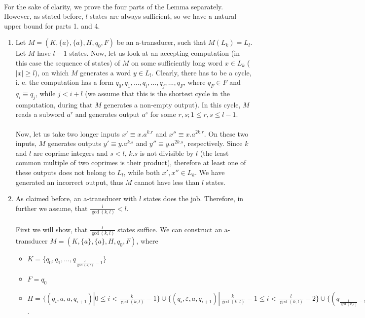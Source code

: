 \paragraph{}
\dokaz For the sake of clarity, we prove the four parts of the Lemma separately. However, as stated before, $l$ states are always sufficient, so we have a natural upper bound for parts 1. and 4.
\begin{enumerate}
\item Let $M = (K, \{a\}, \{a\}, H, q_0, F)$ be an a-transducer, such that $M(L_k) = L_l$. Let $M$ have $l-1$ states. Now, let us look at an accepting computation (in this case the sequence of states) of $M$ on some sufficiently long word $x \in L_k$ ($|x| \geq l$), on which $M$ generates a word $y \in L_l$. Clearly, there has to be a cycle, i. e. the computation has a form $q_0, q_1, ..., q_i, ..., q_j, ..., q_F$, where $q_F \in F$ and $q_i \equiv q_j$, while $j < i + l$ (we assume that this is the shortest cycle in the computation, during that $M$ generates a non-empty output). In this cycle, $M$ reads a subword $a^r$ and generates output $a^s$ for some $r,s; 1 \leq r,s \leq l-1$.

\paragraph{}
Now, let us take two longer inputs $x' \equiv x.a^{k.r}$ and $x'' \equiv x.a^{2k.r}$. On these two inputs, $M$ generates outputs $y' \equiv y.a^{k.s}$ and $y'' \equiv y.a^{2k.s}$, respectively. Since $k$ and $l$ are coprime integers and $s < l$, $k.s$ is not divisible by $l$ (the least common multiple of two coprimes is their product), therefore at least one of these outputs does not belong to $L_l$, while both $x', x'' \in L_k$. We have generated an incorrect output, thus $M$ cannot have less than $l$ states.

\item As claimed before, an a-transducer with $l$ states does the job. Therefore, in further we assume, that $\frac{l}{\gcd(k,l)} < l$.

\paragraph{}
First we will show, that $\frac{l}{\gcd(k,l)}$ states suffice. We can construct an a-transducer $M = (K, \{ a\}, \{ a\}, H, q_0, F)$, where
\begin{itemize}
\item $K = \{ q_0, q_1,  ..., q_{\frac{l}{\gcd(k,l)}-1 }\}$
\item $F = q_0$%
\item $H = \{(q_i, a, a, q_{i+1})| 0 \leq i < \frac{k}{\gcd(k,l)}-1 \} \cup \{(q_i, \varepsilon, a, q_{i+1})| \frac{k}{\gcd(k,l)}-1 \leq i < \frac{l}{\gcd(k,l)}-2 \} \cup \{ (q_{\frac{l}{\gcd(k,l)}-1}, \varepsilon, a, q_0) \}$.
\end{itemize}


\end{enumerate}
